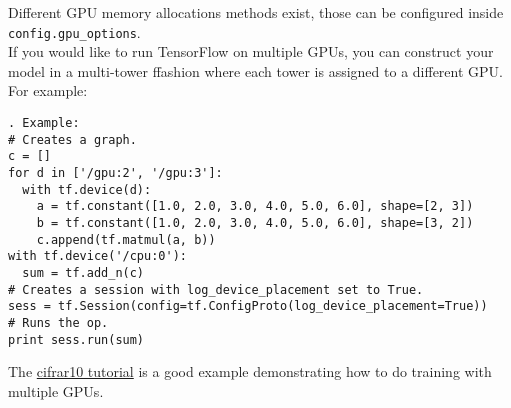\documentclass[11pt,a4paper]{article}
\begin{document}
Different GPU memory allocations methods exist, those can be configured inside \texttt{config.gpu\_options}. \\
If you would like to run TensorFlow on multiple GPUs, you can construct your model in a multi-tower ffashion where each tower is assigned to a different GPU. For example: 
\begin{lstlisting}. Example: 
# Creates a graph.
c = []
for d in ['/gpu:2', '/gpu:3']:
  with tf.device(d):
    a = tf.constant([1.0, 2.0, 3.0, 4.0, 5.0, 6.0], shape=[2, 3])
    b = tf.constant([1.0, 2.0, 3.0, 4.0, 5.0, 6.0], shape=[3, 2])
    c.append(tf.matmul(a, b))
with tf.device('/cpu:0'):
  sum = tf.add_n(c)
# Creates a session with log_device_placement set to True.
sess = tf.Session(config=tf.ConfigProto(log_device_placement=True))
# Runs the op.
print sess.run(sum)
  \end{lstlisting}
The \href{https://www.tensorflow.org/versions/r0.11/tutorials/deep_cnn/index.html}{cifrar10 tutorial} is a good example demonstrating how to do training with multiple GPUs. 
\end{document}
